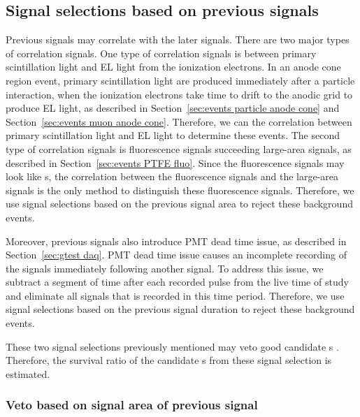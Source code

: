 \subsection{Signal selections based on previous signals}
\label{sec:uncor}
Previous signals may correlate with the later signals. There are two major types of correlation signals.  One type of correlation signals is between primary scintillation light and EL light from the ionization electrons. In an anode cone region event, primary scintillation light are produced immediately after a particle interaction, when the ionization electrons take time to drift to the anodic grid to produce EL light, as described in Section~\ref{sec:events particle anode cone} and Section~\ref{sec:events muon anode cone}. Therefore, we can the correlation between primary scintillation light and EL light to determine these events. The second type of correlation signals is fluorescence signals succeeding large-area signals, as described in Section~\ref{sec:events PTFE fluo}. Since the fluorescence signals may look like \ees s, the correlation between the fluorescence signals and the large-area signals is the only method to distinguish these fluorescence signals. Therefore, we use signal selections based on the previous signal area to reject these background events.

Moreover, previous signals also introduce PMT dead time issue, as described in Section~\ref{sec:gtest daq}. PMT dead time issue causes an incomplete recording of the signals immediately following another signal. To address this issue, we subtract a segment of time after each recorded pulse from the live time of study and eliminate all signals that is recorded in this time period. Therefore, we use signal selections based on the previous signal duration to reject these background events.

These two signal selections previously mentioned may veto good candidate \ees s . Therefore, the survival ratio of the candidate \ees s from these signal selection is estimated.


\subsubsection{Veto based on signal area of previous signal}
